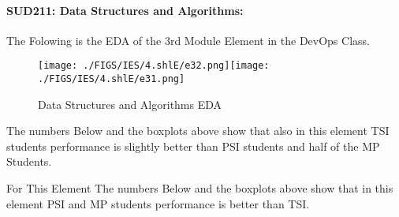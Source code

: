 \documentclass[12pt]{extreport}
\begin{document}

\paragraph{\large SUD211: Data Structures and Algorithms:\\
 }
The Folowing is the EDA of the 3rd Module Element in the DevOps Class. 

\begin{figure}[H]
	\centering
	\texttt{[image: ./FIGS/IES/4.shlE/e32.png]}\texttt{[image: ./FIGS/IES/4.shlE/e31.png]}
	\caption{Data Structures and Algorithms EDA}
	\label{fig:46}
\end{figure}

The numbers Below and the boxplots above show that also in this element  TSI students performance is slightly better than PSI students and half of the MP Students.

For This Element The numbers Below and the boxplots above show that in this element  PSI and MP students performance is  better than TSI.


\begin{comment}
\subparagraph{Interpretation of the Box-plots:}
For This Element 


\begin{enumerate}	
	\item The MP Class Box-Plot:
	\begin{enumerate}
		\item MAX = a {} {} {} {} {} {} {} {} UQ = b {} {} {} {} {} {} {} {} Median = c
		\item LQ = d {} {} {} {} {} {} {} {}  MIN =	l {} {} {} {} {} {} {} {}  IQR = e - f = g
	\end{enumerate}
	\item The PSI Class Box-Plot:
	\begin{enumerate}
		\item MAX = a {} {} {} {} {} {} {} {} UQ = b {} {} {} {} {} {} {} {} Median = c
		\item LQ = d {} {} {} {} {} {} {} {}  MIN =	e {} {} {} {} {} {} {} {} IQR = f - g = h	
	\end{enumerate}
	\item The TSI Class Box-Plot:
	\begin{enumerate}
		\item MAX = a {} {} {} {} {} {} {} {} UQ = b {} {} {} {} {} {} {} {} Median = c
		\item LQ = d {} {} {} {} {} {} {} {} MIN = e {} {} {} {} {} {} {} {} IQR = f - g = h	
	\end{enumerate}
\end{enumerate}

\subparagraph{Interpretation of the histogram:}
This Frequency Distribution is (Skeness) with the following descriptive statistics:
\begin{enumerate}
	\item Mean = 
	\item STD = 
	\item Range = a - b = c
	\item IQR = a-b = c 
\end{enumerate}
\end{comment}
\end{document}
